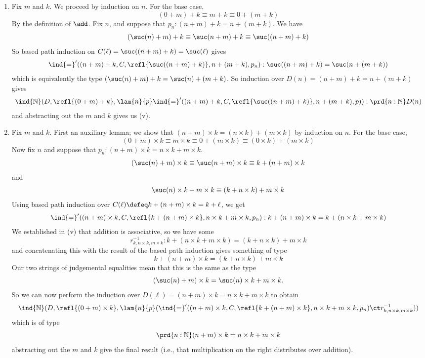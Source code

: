 \begin{enumerate}
\item Fix $m$ and $k$.  We proceed by induction on $n$.  For the base case,
\[
(0 + m) + k \equiv m + k \equiv 0 + (m + k)
\]
By the definition of $\add$.  Fix $n$, and suppose that $p_{n} : (n + m) + k =
n + (m + k)$.  We have
\[
(\suc(n) + m) + k
\equiv \suc(n + m) + k
\equiv \suc((n+m)+k)
\]
So based path induction on $C(\ell) = \suc((n+m)+k) = \suc(\ell)$ gives
\[
\ind{=}'((n+m)+k, C, \refl{\suc((n+m)+k)}, n+(m+k), p_{n})
:
\suc((n+m)+k) = \suc(n+(m+k))
\]
which is equivalently the type $(\suc(n)+m)+k = \suc(n) + (m + k)$.  So
induction over $D(n) = (n+m)+k = n+(m+k)$ gives
\[
\ind{\mathbb{N}}(D, \refl{(0+m)+k}, 
\lam{n}{p}
\ind{=}'((n+m)+k, C, \refl{\suc((n+m)+k)}, n+(m+k), p)
)
:
\prd{n:\mathbb{N}}D(n)
\]
and abstracting out the $m$ and $k$ gives us (v).

\item Fix $m$ and $k$.  First an auxiliary lemma; we show that $(n+m) \times k
= (n \times k) + (m \times k)$ by induction on $n$.  For the base case,
\[
(0+m) \times k \equiv m \times k \equiv 0 + (m \times k) \equiv (0 \times k)
+ (m \times k)
\]
Now fix $n$ and suppose that $p_{n} : (n+m) \times k = n \times k + m \times
k$.
\[
(\suc(n) + m) \times k
\equiv \suc(n + m) \times k
\equiv k + (n + m) \times k
\]
and
\[
\suc(n) \times k + m \times k
\equiv 
(k + n \times k) + m \times k
\]
Using based path induction over $C(\ell) \defeq k + (n + m) \times k = k +
\ell$, we get
\[
\ind{=}'((n+m)\times k, C, \refl{k+(n+m)\times k}, n \times k + m \times
k, p_{n})
:
k + (n+m) \times k = k + (n \times k + m \times k)
\]
We established in (v) that addition is associative, so we have some
\[
r_{k, n \times k, m \times k}^{-1} 
: k + (n \times k + m \times k) = (k + n
\times k) + m \times k
\]
and concatenating this with the result of the based path induction gives
something of type
\[
k + (n + m) \times k = (k + n \times k) + m \times k
\]
Our two strings of judgemental equalities mean that this is the same as the
type
\[
(\suc(n) + m) \times k = \suc(n) \times k + m \times k.
\]
So we can now perform the induction over $D(\ell) = (n + m) \times k = n \times
k + m \times k$ to obtain
\[
\ind{\mathbb{N}}(D, \refl{(0+m) \times k}, 
\lam{n}{p}(
\ind{=}'((n+m)\times k, C, \refl{k+(n+m)\times k}, n \times k + m \times
k, p_{n})
\ct
r_{k, n \times k, m \times k}^{-1})
)
\]
which is of type
\[
\prd{n : \mathbb{N}} (n+m) \times k = n \times k + m \times k
\]
abstracting out the $m$ and $k$ give the final result (i.e., that
multiplication on the right distributes over addition).


\end{enumerate}
